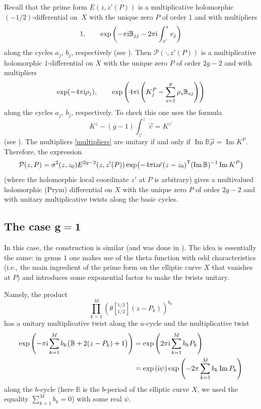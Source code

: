\documentclass[pdftex]{sigma}
\numberwithin{equation}{section}
\theoremstyle{definition}
\begin{document}
Recall that the prime form $E(z,z'(P))$ is a multiplicative holomorphic $(-1/2)$-differential on~$X$ with the unique zero $P$ of order $1$ and with multipliers
\[1, \qquad \exp\left(-\pi {\rm i} \mathbb{B}_{jj}-2\pi {\rm i} \int_{z'}^z v_j\right)\]
along the cycles $a_j$, $b_j$, respectively (see \cite[equation~(1.4)]{Fay}). Then $\mathcal{P}(\cdot,z'(P))$ is a multiplicative holomorphic $1$-differential on $X$ with the unique zero $P$ of order $2g-2$ and with multipliers
\begin{equation}
\label{multipliers}
\exp(-4\pi {\rm i} \rho_j), \qquad \exp\left(4\pi {\rm i} \left(K_j^{P}-\sum_{s=1}^{g}\rho_s\mathbb{B}_{sj}\right)\right)
\end{equation}
along the cycles $a_j$, $b_j$, respectively. To check this one uses the formula
\[K^z-(g-1)\int_{z'}^z \vec{v}=K^{z'}\]
(see \cite[Proposition 1.1]{Fay}). The multipliers \eqref{multipliers} are unitary if and only if
$\operatorname{Im}\mathbb{B}\vec{\rho}=\operatorname{Im} K^{P}$.
Therefore, the expression
\begin{equation}
\label{Troy 3}
\mathcal{P}(z , P)=\sigma^2(z ,z_0)E^{2g-2}(z ,z'(P))\exp\bigl(-4\pi {\rm i} \mathscr{A}(z -z_0)^{\mathsf T}(\operatorname{Im}\mathbb{B})^{-1}\operatorname{Im} K^{P}\bigr)
\end{equation}
(where the holomorphic local coordinate $z'$ at $P$ is arbitrary) gives a multivalued holomorphic (Prym) differential on $X$ with the unique zero $P$ of order $2g-2$ and with unitary multiplicative twists along the basic cycles.

\subsection*{The case $\boldsymbol{g=1}$} In this case, the construction is similar (and was done in \cite[Section 4.2.3]{PirioFlatTori}). The idea is essentially the same: in genus $1$ one makes use of the theta function  with odd characteristics (i.e., the main ingredient of the prime form on the elliptic curve $X$ that vanishes at $P$) and introduces some exponential factor to make the twists unitary.

Namely, the product
\[\prod_{k=1}^M \left( \theta\left[^{1/2}_{1/2}\right](z-P_k)\right)^{b_k}\]
has a unitary multiplicative twist along the $a$-cycle and
the multiplicative twist
\begin{align*}
\exp{\left(-\pi {\rm i} \sum_{k=1}^Mb_k\bigl({\mathbb B}+2(z-P_k)+1\bigr)\right)}&=\exp{\left(2\pi {\rm i} \sum_{k=1}^Mb_k P_k\right)}\\
&=\exp{({\rm i}\psi)}\exp{\left(-2\pi \sum_{k=1}^Mb_k \operatorname{Im} P_k\right)}
\end{align*}
along the $b$-cycle (here ${\mathbb B}$ is the $b$-period of the elliptic curve $X$, we used the equality $\sum_{k=1}^M b_k=0$) with some real $\psi$.
\end{document}
